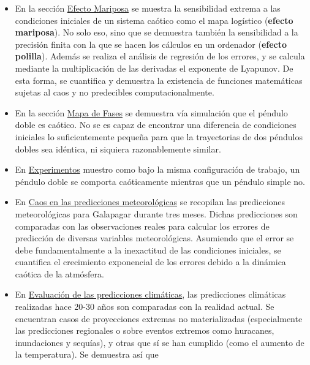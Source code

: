 \documentclass[
  10pt,
  a4paper,
  DIV=11,
  numbers=noendperiod,
  open=any]{scrreprt}
\numberwithin{equation}{chapter}
\numberwithin{equation}{section}
\renewcommand{\[}{\begin{equation}}
\renewcommand{\]}{\end{equation}}
\begin{document}
\begin{itemize}
\item
  En la sección
  \href{https://colacaos.github.io/ColaCAOS/01-logistica/lyapunov.html}{Efecto
  Mariposa} se muestra la sensibilidad extrema a las condiciones
  iniciales de un sistema caótico como el mapa logístico (\textbf{efecto
  mariposa}). No solo eso, sino que se demuestra también la sensibilidad
  a la precisión finita con la que se hacen los cálculos en un ordenador
  (\textbf{efecto polilla}). Además se realiza el análisis de regresión
  de los errores, y se calcula mediante la multiplicación de las
  derivadas el exponente de Lyapunov. De esta forma, se cuantifica y
  demuestra la existencia de funciones matemáticas sujetas al caos y no
  predecibles computacionalmente.
\item
  En la sección
  \href{https://colacaos.github.io/ColaCAOS/02-pendulo-doble/fractal.html}{Mapa
  de Fases} se demuestra vía simulación que el péndulo doble es caótico.
  No se es capaz de encontrar una diferencia de condiciones iniciales lo
  suficientemente pequeña para que la trayectorias de dos péndulos
  dobles sea idéntica, ni siquiera razonablemente similar. 
\item
  En
  \href{https://colacaos.github.io/ColaCAOS/02-pendulo-doble/experimentos.html}{Experimentos}
  muestro como bajo la misma configuración de trabajo, un péndulo doble
  se comporta caóticamente mientras que un péndulo simple no.
\item
  En
  \href{https://colacaos.github.io/ColaCAOS/03-meteorologia/predicciones.html}{Caos
  en las predicciones meteorológicas} se recopilan las predicciones
  meteorológicas para Galapagar durante tres meses. Dichas predicciones
  son comparadas con las observaciones reales para calcular los errores
  de predicción de diversas variables meteorológicas. Asumiendo que el
  error se debe fundamentalmente a la inexactitud de las condiciones
  iniciales, se cuantifica el crecimiento exponencial de los errores
  debido a la dinámica caótica de la atmósfera.
\item
  En
  \href{https://colacaos.github.io/ColaCAOS/04-clima/evaluacion.html}{Evaluación
  de las predicciones climáticas}, las predicciones climáticas
  realizadas hace 20-30 años son comparadas con la realidad actual. Se
  encuentran casos de proyecciones extremas no materializadas
  (especialmente las predicciones regionales o sobre eventos extremos
  como huracanes, inundaciones y sequías), y otras que sí se han
  cumplido (como el aumento de la temperatura). Se demuestra así que

\end{itemize}
\end{document}
